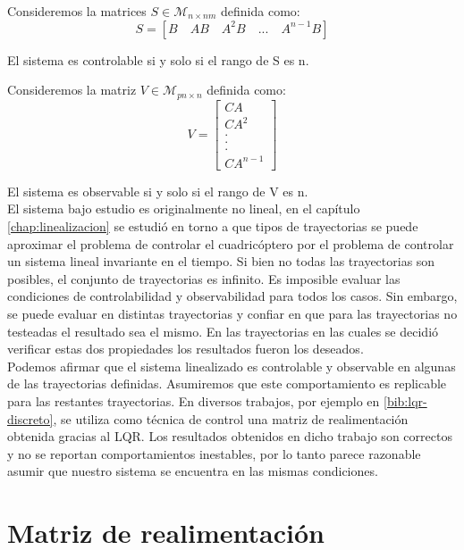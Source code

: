 \documentclass[main]{subfiles}
\begin{document}
Consideremos la matrices $S\in \mathcal{M}_{n \times nm}$  definida como:
\begin{equation}
\label{eq:contr}
S = [B \quad AB \quad A^2B \quad ...\quad A^{n-1}B]
\end{equation}

El sistema es controlable si y solo si el rango de S es n. 

Consideremos la matriz $V\in \mathcal{M}_{pn \times n}$ definida como:
\begin{equation}
\label{eq:obs}
V=
\left[
\begin{array}{c}
 CA\\
CA^2\\
.\\
.\\
.\\
CA^{n-1}
\end{array}\right]
\end{equation}

El sistema es observable si y solo si el rango de V es n.\\

El sistema bajo estudio es originalmente no lineal, en el cap\'itulo \ref{chap:linealizacion} se estudi\'o en torno a que tipos de trayectorias se puede aproximar el problema de controlar el cuadric\'optero por el problema de controlar un sistema lineal invariante en el tiempo. Si bien no todas las trayectorias son posibles, el conjunto de trayectorias es infinito. Es imposible evaluar las condiciones de controlabilidad y observabilidad para todos los casos. Sin embargo, se puede evaluar en distintas trayectorias y confiar en que para las trayectorias no testeadas el resultado sea el mismo. En las trayectorias en las cuales se decidi\'o verificar estas dos propiedades los resultados fueron los deseados.\\

Podemos afirmar que el sistema linealizado es controlable y observable en algunas de las trayectorias definidas. Asumiremos que este comportamiento es replicable para las restantes trayectorias. En diversos trabajos, por ejemplo en \ref{bib:lqr-discreto}, se utiliza como t\'ecnica de control una matriz de realimentaci\'on obtenida gracias al LQR. Los resultados obtenidos en dicho trabajo son correctos y no se reportan comportamientos inestables, por lo tanto parece razonable asumir que nuestro sistema se encuentra en las mismas condiciones.   

\section{Matriz de realimentaci\'on}
\end{document}
